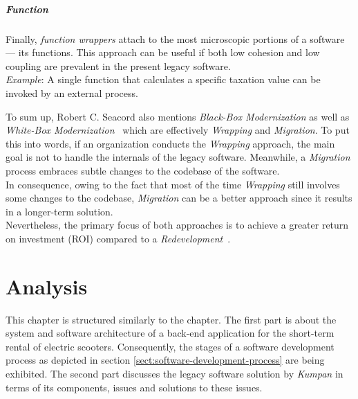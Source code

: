 \documentclass[12pt,a4paper]{report}
\begin{document}
\paragraph{Function}
Finally, \textit{function wrappers} attach to the most microscopic portions of a software ---
its functions. This approach can be useful if both low cohesion and low coupling are prevalent
in the present legacy software.\\
\textit{Example}: A single function that calculates a specific taxation value
can be invoked by an external process.
\newline

To sum up, Robert C. Seacord also mentions \textit{Black-Box Modernization} as well as
\textit{White-Box Modernization}~\cite{seacord-modernizing-legacy} which are
effectively \textit{Wrapping} and \textit{Migration}. To put this into words,
if an organization conducts the \textit{Wrapping} approach, the main goal is not
to handle the internals of the legacy software.
Meanwhile, a \textit{Migration} process embraces subtle changes to the codebase of the software.\\
In consequence, owing to the fact that most of the time \textit{Wrapping} still
involves some changes to the codebase, \textit{Migration} can be a better
approach since it results in a longer-term solution.\\
Nevertheless, the primary focus of both approaches is to achieve a greater
return on investment (ROI) compared to a \textit{Redevelopment}~\cite{tilley-perspectives-reengineering}.



\chapter{Analysis} \label{chap:analysis}


This chapter is structured similarly to the \textit{}
chapter. The first part is about the system and software architecture of
a back-end application for the short-term rental of electric scooters.
Consequently, the stages of a software development process as depicted
in section \ref{sect:software-development-process} are being exhibited.
The second part discusses the legacy software solution by \textit{Kumpan}
in terms of its components, issues and solutions to these issues.
\end{document}
